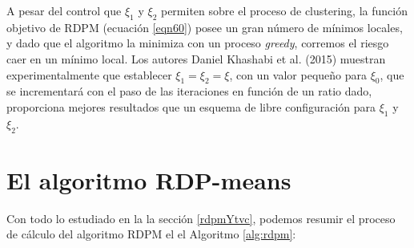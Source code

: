A pesar del control que $\xi_1$ y $\xi_2$ permiten sobre el proceso de clustering, la función objetivo de \acs{RDPM} (ecuación \ref{eqn60}) posee un gran número de mínimos locales, y dado que el algoritmo la minimiza con un proceso \textit{greedy}, corremos el riesgo caer en un mínimo local. Los autores Daniel Khashabi et al. (2015) \cite{RDPM:2015} muestran experimentalmente que establecer $\xi_1 = \xi_2 = \xi$, con un valor pequeño para $\xi_0$, que se incrementará con el paso de las iteraciones en función de un ratio dado, proporciona mejores resultados que un esquema de libre configuración para $\xi_1$ y $\xi_2$.

\section{El algoritmo RDP-means}

Con todo lo estudiado en la la sección \ref{rdpmYtvc}, podemos resumir el proceso de cálculo del algoritmo \acf{RDPM}  el el Algoritmo \ref{alg:rdpm}:


